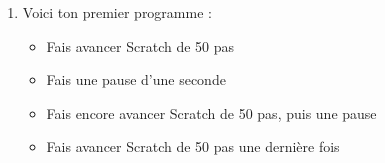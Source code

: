 \documentclass[class=report,crop=false, 12pt]{standalone}
\begin{document}
\begin{activite}
\begin{enumerate}
  

  \item Voici ton premier programme :
  \begin{itemize}
    \item Fais avancer Scratch de 50 pas
    \item Fais une pause d'une seconde
    \item Fais encore avancer Scratch de 50 pas, puis une pause
    \item Fais avancer Scratch de 50 pas une dernière fois
  \end{itemize}
  

  
\end{enumerate}
 
\end{activite}
\end{document}

